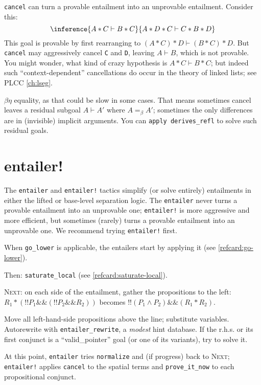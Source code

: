 \documentclass[12pt,fleqn,openany,oneside,showtrims]{memoir}
\newcommand{\ychapter}[2]{\chapter[#1]{#1}}
\begin{document}
\label{refcard:cancel-warning}
\lstinline{cancel} can turn a provable entailment
into an unprovable entailment.  Consider this:
\[\inference{A*C \vdash B*C}{A*D*C \vdash  C*B*D}\]
This goal is provable by first rearranging to
$(A*C)*D \vdash (B*C)*D$. But \lstinline{cancel}
may aggressively cancel \lstinline{C} and \lstinline{D},
leaving $A \vdash B$, which is not provable.
You might wonder, what kind of crazy hypothesis is $A*C \vdash B*C$;
but indeed such ``context-dependent'' cancellations do occur
in the theory of linked lists; see
PLCC \autoref{ch:lseg}.

 $\beta\eta$ equality,\label{cancel-beta}
as that could be slow in some cases.  That means sometimes
cancel leaves a residual subgoal $A\vdash A'$ where $A=_\beta A'$;
sometimes the only differences are in (invisible) implicit arguments.
You can \lstinline{apply derives_refl} to solve such residual goals.

\ychapter{entailer!}{(PLCC Ch.~\ref{ch:clight-auto})}
\label{refcard:entailer}
The \lstinline{entailer} and \lstinline{entailer!} tactics
simplify (or solve entirely) entailments in either the
lifted or base-level separation logic.  The \lstinline{entailer}
never turns a provable entailment into an unprovable one;
\lstinline{entailer!} is more aggressive and more efficient,
but sometimes (rarely) turns a provable entailment into an unprovable one.
We recommend trying \lstinline{entailer!} first.

When \lstinline{go_lower} is applicable, the entailers start by applying it
(see \autoref{refcard:go-lower}).

Then: \lstinline{saturate_local} (see \autoref{refcard:saturate-local}).

\textsc{Next:} on each side of the entailment, gather the propositions to the left:
\(
R_1 * (!!P_1 \&\& (!!P_2 \&\& R_2))\)
becomes
\(!!(P_1 \wedge P_2) \&\& (R_1 * R_2)\).

Move all left-hand-side propositions above the line; substitute variables.
Autorewrite with \lstinline{entailer_rewrite}, a \emph{modest} hint database.
If the r.h.s. or its first conjunct is a ``valid\_pointer'' goal (or one of its variants), try to solve it.

At this point, \lstinline{entailer} tries \lstinline{normalize} and (if progress) back to \textsc{Next;} \lstinline{entailer!} applies \lstinline{cancel} to the spatial terms and \lstinline{prove_it_now} to each propositional conjunct.
\end{document}

